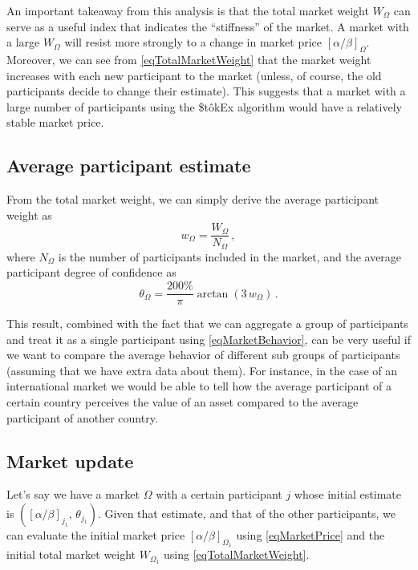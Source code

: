 \documentclass[letterpaper]{article}
\newcommand{\priceAB}{\left[\alpha / \beta\right]}
\newcommand{\StokEx}{\$t\^{o}kEx}
\begin{document}
An important takeaway from this analysis is that the total market weight $W_\Omega$ can serve as a useful index that indicates the ``stiffness'' of the market. A market with a large $W_\Omega$ will resist more strongly to a change in market price $\priceAB_\Omega$. Moreover, we can see from \eqref{eqTotalMarketWeight} that the market weight increases with each new participant to the market (unless, of course, the old participants decide to change their estimate). This suggests that a market with a large number of participants using the \StokEx{} algorithm would have a relatively stable market price.

\subsection{Average participant estimate}

From the total market weight, we can simply derive the average participant weight as
\begin{equation}
    w_\Omega = \frac{W_\Omega}{N_\Omega} \,, \label{eqAverageParticipantWeight}
\end{equation}
where $N_\Omega$ is the number of participants included in the market, and the average participant degree of confidence as
\begin{equation}
    \theta_\Omega = \frac{200\%}{\pi} \arctan \left( 3 \, w_\Omega\right) \,. \label{eqAvergageParticipantDegree}
\end{equation}

This result, combined with the fact that we can aggregate a group of participants and treat it as a single participant using \eqref{eqMarketBehavior}, can be very useful if we want to compare the average behavior of different sub groups of participants (assuming that we have extra data about them). For instance, in the case of an international market we would be able to tell how the average participant of a certain country perceives the value of an asset compared to the average participant of another country.


\subsection{Market update}\label{secMarketUpdate}

Let's say we have a market $\Omega$ with a certain participant $j$ whose initial estimate is $(\priceAB_{j_1},\, \theta_{j_1})$. Given that estimate, and that of the other participants, we can evaluate the initial market price $\priceAB_{\Omega_1}$ using \eqref{eqMarketPrice} and the initial total market weight $W_{\Omega_1}$ using \eqref{eqTotalMarketWeight}.
\end{document}
